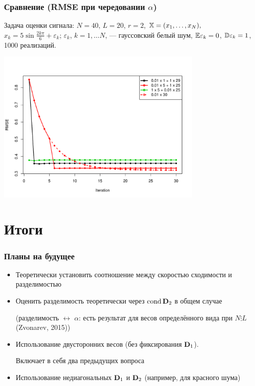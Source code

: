 \documentclass[unicode, notheorems]{beamer}
\DeclareMathOperator{\cond}{cond}
\begin{document}
\begin{frame}
	\frametitle{Сравнение (RMSE при чередовании $\alpha$)}
	Задача оценки сигнала: $N = 40$, $L = 20$, $r = 2$, $\mathbb{X} = (x_{1}, \ldots, x_N),$  $x_k = 5\sin{\frac{2 k \pi}{6}} + \varepsilon_k$; $\varepsilon_k$, $k = 1, \ldots N$, --- гауссовский белый шум, $\mathbb{E} \varepsilon_k = 0$, $\mathbb{D} \varepsilon_k = 1$, 1000 реализаций.
	
	\vspace{-1cm}
	\begin{center}
		\includegraphics*[width = 10cm]{various.pdf}
	\end{center}
\end{frame}

\section{Итоги}

\begin{frame}
	\frametitle{Планы на будущее}
	\begin{itemize}
		\item Теоретически установить соотношение между скоростью сходимости и разделимостью
		\item Оценить разделимость теоретически через $\cond \bfD_2$ в общем случае
		
		(разделимость $\leftrightarrow$ $\alpha$: есть результат для весов определённого вида при $N \vdots L$ (Zvonarev, 2015))
		\item Использование двусторонних весов (без фиксирования $\mathbf{D}_1$).
		
		Включает в себя два предыдущих вопроса
		\item Использование недиагональных $\mathbf{D}_1$ и $\mathbf{D}_2$ (например, для красного шума)
	\end{itemize}
	
\end{frame}
\end{document}
